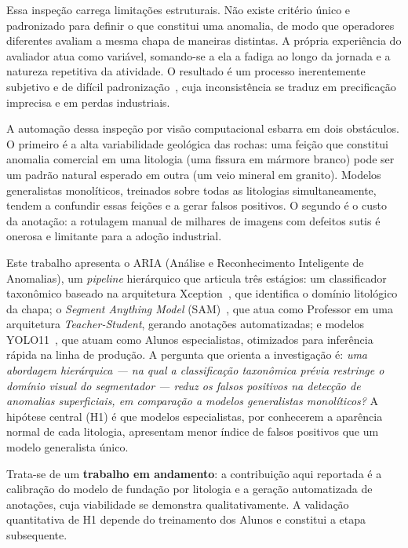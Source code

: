 \documentclass[10pt,conference]{IEEEtran}
\begin{document}
Essa inspeção carrega limitações estruturais. Não existe critério único e padronizado para definir o que constitui uma anomalia, de modo que operadores diferentes avaliam a mesma chapa de maneiras distintas. A própria experiência do avaliador atua como variável, somando-se a ela a fadiga ao longo da jornada e a natureza repetitiva da atividade. O resultado é um processo inerentemente subjetivo e de difícil padronização~\cite{stone_subjectivity_castro2018}, cuja inconsistência se traduz em precificação imprecisa e em perdas industriais.

A automação dessa inspeção por visão computacional esbarra em dois obstáculos. O primeiro é a alta variabilidade geológica das rochas: uma feição que constitui anomalia comercial em uma litologia (uma fissura em mármore branco) pode ser um padrão natural esperado em outra (um veio mineral em granito). Modelos generalistas monolíticos, treinados sobre todas as litologias simultaneamente, tendem a confundir essas feições e a gerar falsos positivos. O segundo é o custo da anotação: a rotulagem manual de milhares de imagens com defeitos sutis é onerosa e limitante para a adoção industrial.

Este trabalho apresenta o ARIA (Análise e Reconhecimento Inteligente de Anomalias), um \textit{pipeline} hierárquico que articula três estágios: um classificador taxonômico baseado na arquitetura Xception~\cite{xception_chollet2017}, que identifica o domínio litológico da chapa; o \textit{Segment Anything Model} (SAM)~\cite{sam_kirillov2023}, que atua como Professor em uma arquitetura \textit{Teacher-Student}, gerando anotações automatizadas; e modelos YOLO11~\cite{yolo11_khanam2024}, que atuam como Alunos especialistas, otimizados para inferência rápida na linha de produção. A pergunta que orienta a investigação é: \textit{uma abordagem hierárquica --- na qual a classificação taxonômica prévia restringe o domínio visual do segmentador --- reduz os falsos positivos na detecção de anomalias superficiais, em comparação a modelos generalistas monolíticos?} A hipótese central (H1) é que modelos especialistas, por conhecerem a aparência normal de cada litologia, apresentam menor índice de falsos positivos que um modelo generalista único.

Trata-se de um \textbf{trabalho em andamento}: a contribuição aqui reportada é a calibração do modelo de fundação por litologia e a geração automatizada de anotações, cuja viabilidade se demonstra qualitativamente. A validação quantitativa de H1 depende do treinamento dos Alunos e constitui a etapa subsequente.
\end{document}
